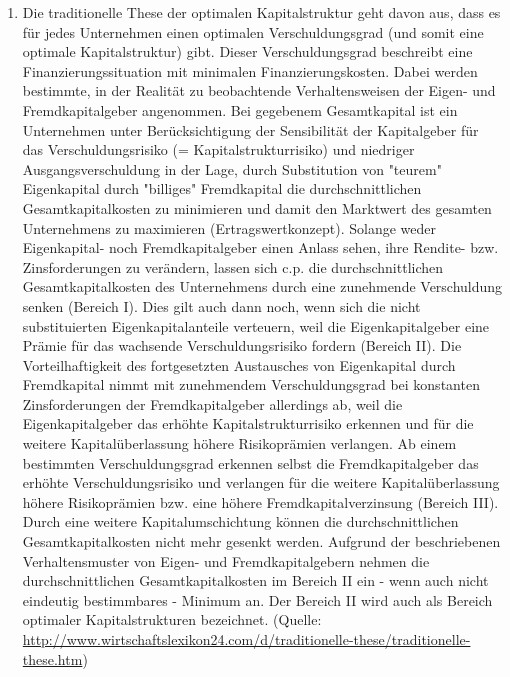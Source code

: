 \documentclass{article}
\begin{document}
\begin{enumerate}[label=(\alph*)]
		\item Die traditionelle These der optimalen Kapitalstruktur geht davon aus, dass es für jedes Unternehmen einen optimalen Verschuldungsgrad (und somit eine optimale Kapitalstruktur) gibt. Dieser Verschuldungsgrad beschreibt eine Finanzierungssituation mit minimalen Finanzierungskosten. Dabei werden bestimmte, in der Realität zu beobachtende Verhaltensweisen der Eigen- und Fremdkapitalgeber angenommen. Bei gegebenem Gesamtkapital ist ein Unternehmen unter Berücksichtigung der Sensibilität der Kapitalgeber für das Verschuldungsrisiko (= Kapitalstrukturrisiko) und niedriger Ausgangsverschuldung in der Lage, durch Substitution von "teurem" Eigenkapital durch "billiges" Fremdkapital die durchschnittlichen Gesamtkapitalkosten zu minimieren und damit den Marktwert des gesamten Unternehmens zu maximieren (Ertragswertkonzept). Solange weder Eigenkapital- noch Fremdkapitalgeber einen Anlass sehen, ihre Rendite- bzw. Zinsforderungen zu verändern, lassen sich c.p. die durchschnittlichen Gesamtkapitalkosten des Unternehmens durch eine zunehmende Verschuldung senken (Bereich I). Dies gilt auch dann noch, wenn sich die nicht substituierten Eigenkapitalanteile verteuern, weil die Eigenkapitalgeber eine Prämie für das wachsende Verschuldungsrisiko fordern (Bereich II). Die Vorteilhaftigkeit des fortgesetzten Austausches von Eigenkapital durch Fremdkapital nimmt mit zunehmendem Verschuldungsgrad bei konstanten Zinsforderungen der Fremdkapitalgeber allerdings ab, weil die Eigenkapitalgeber das erhöhte Kapitalstrukturrisiko erkennen und für die weitere Kapitalüberlassung höhere Risikoprämien verlangen. Ab einem bestimmten Verschuldungsgrad erkennen selbst die Fremdkapitalgeber das erhöhte Verschuldungsrisiko und verlangen für die weitere Kapitalüberlassung höhere Risikoprämien bzw. eine höhere Fremdkapitalverzinsung (Bereich III). Durch eine weitere Kapitalumschichtung können die durchschnittlichen Gesamtkapitalkosten nicht mehr gesenkt werden. Aufgrund der beschriebenen Verhaltensmuster von Eigen- und Fremdkapitalgebern nehmen die durchschnittlichen Gesamtkapitalkosten im Bereich II ein - wenn auch nicht eindeutig bestimmbares - Minimum an. Der Bereich II wird auch als Bereich optimaler Kapitalstrukturen bezeichnet. (Quelle: \url{http://www.wirtschaftslexikon24.com/d/traditionelle-these/traditionelle-these.htm})
	\end{enumerate}
	
\end{document}
